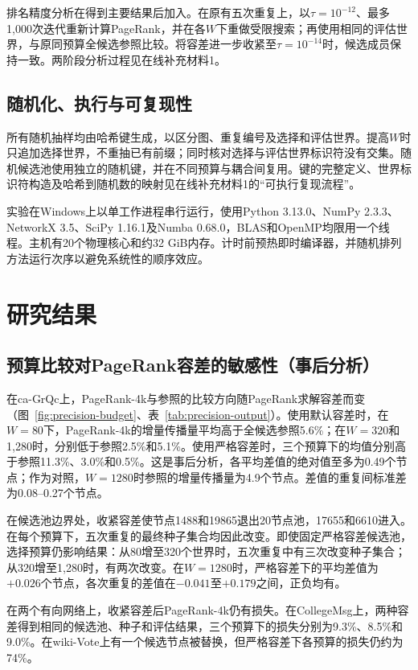 \documentclass[smallextended]{svjour3}
\begin{document}
排名精度分析在得到主要结果后加入。在原有五次重复上，以$\tau=10^{-12}$、最多1,000次迭代重新计算PageRank，并在各$W$下重做受限搜索；再使用相同的评估世界，与原同预算全候选参照比较。将容差进一步收紧至$\tau=10^{-14}$时，候选成员保持一致。两阶段分析过程见在线补充材料1。

\subsection{随机化、执行与可复现性}
所有随机抽样均由哈希键生成，以区分图、重复编号及选择和评估世界。提高$W$时只追加选择世界，不重抽已有前缀；同时核对选择与评估世界标识符没有交集。随机候选池使用独立的随机键，并在不同预算与耦合间复用。键的完整定义、世界标识符构造及哈希到随机数的映射见在线补充材料1的“可执行复现流程”。

实验在Windows上以单工作进程串行运行，使用Python 3.13.0、NumPy 2.3.3、NetworkX 3.5、SciPy 1.16.1及Numba 0.68.0，BLAS和OpenMP均限用一个线程。主机有20个物理核心和约32 GiB内存。计时前预热即时编译器，并随机排列方法运行次序以避免系统性的顺序效应。

\section{研究结果}
\subsection{预算比较对PageRank容差的敏感性（事后分析）}
在ca-GrQc上，PageRank-4k与参照的比较方向随PageRank求解容差而变（图~\ref{fig:precision-budget}、表~\ref{tab:precision-output}）。使用默认容差时，在$W=80$下，PageRank-4k的增量传播量平均高于全候选参照5.6\%；在$W=320$和1,280时，分别低于参照2.5\%和5.1\%。使用严格容差时，三个预算下的均值分别高于参照11.3\%、3.0\%和0.5\%。这是事后分析，各平均差值的绝对值至多为0.49个节点；作为对照，$W=1280$时参照的增量传播量为4.9个节点。差值的重复间标准差为0.08--0.27个节点。

在候选池边界处，收紧容差使节点1488和19865退出20节点池，17655和6610进入。在每个预算下，五次重复的最终种子集合均因此改变。即使固定严格容差候选池，选择预算仍影响结果：从80增至320个世界时，五次重复中有三次改变种子集合；从320增至1,280时，有两次改变。在$W=1280$时，严格容差下的平均差值为$+0.026$个节点，各次重复的差值在$-0.041$至$+0.179$之间，正负均有。

在两个有向网络上，收紧容差后PageRank-4k仍有损失。在CollegeMsg上，两种容差得到相同的候选池、种子和评估结果，三个预算下的损失分别为9.3\%、8.5\%和9.0\%。在wiki-Vote上有一个候选节点被替换，但严格容差下各预算的损失仍约为74\%。
\end{document}
